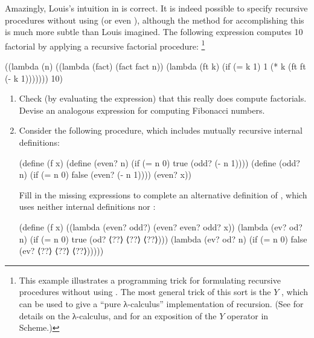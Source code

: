 \begin{exercise}
	\label{Exercise 4.21}
	Amazingly, Louis’s intuition in  is correct.
	It is indeed possible to specify recursive procedures without using  (or even ), although the method for accomplishing this is much more subtle than Louis imagined.
	The following expression computes 10 factorial by applying a recursive factorial procedure:%
	\footnote{
		This example illustrates a programming trick for formulating recursive procedures without using .
		The most general trick of this sort is the \( Y \) , which can be used to give a “pure λ-calculus” implementation of recursion.
		(See  for details on the λ-calculus, and  for an exposition of the \( Y \) operator in Scheme.)
	}
	\begin{scheme}
	  ((lambda (n)
	     ((lambda (fact) (fact fact n))
	      (lambda (ft k) (if (= k 1) 1 (* k (ft ft (- k 1)))))))
	   10)
	\end{scheme}
	\begin{enumerate}[label = \alph*., leftmargin = *]

		\item
			Check (by evaluating the expression) that this really does compute factorials.
			Devise an analogous expression for computing Fibonacci numbers.

		\item
			Consider the following procedure, which includes mutually recursive internal definitions:
			\begin{scheme}
			  (define (f x)
			    (define (even? n)
			      (if (= n 0) true  (odd?  (- n 1))))
			    (define (odd? n)
			      (if (= n 0) false (even? (- n 1))))
			    (even? x))
			\end{scheme}
			Fill in the missing expressions to complete an alternative definition of , which uses neither internal definitions nor :
			\begin{scheme}
			  (define (f x)
			    ((lambda (even? odd?) (even? even? odd? x))
			     (lambda (ev? od? n)
			       (if (= n 0) true (od? ⟨??⟩ ⟨??⟩ ⟨??⟩)))
			     (lambda (ev? od? n)
			       (if (= n 0) false (ev? ⟨??⟩ ⟨??⟩ ⟨??⟩)))))
			\end{scheme}

	\end{enumerate}
\end{exercise}



